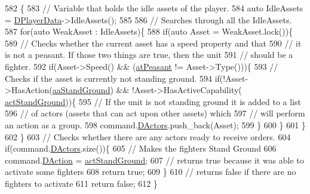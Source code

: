 \begin{DoxyCode}
582                                                               \{
583     \textcolor{comment}{// Variable that holds the idle assets of the player.}
584     \textcolor{keyword}{auto} IdleAssets = \hyperlink{classCAIPlayer_a83b5113c8f7e80df54940b647c5ee2e6}{DPlayerData}->IdleAssets();
585     
586     \textcolor{comment}{// Searches through all the IdleAssets.}
587     \textcolor{keywordflow}{for}(\textcolor{keyword}{auto} WeakAsset : IdleAssets)\{
588         \textcolor{keywordflow}{if}(\textcolor{keyword}{auto} Asset = WeakAsset.lock())\{
589             \textcolor{comment}{// Checks whether the current asset has a speed property and that}
590             \textcolor{comment}{// it is not a peasant. If those two things are true, then the unit}
591             \textcolor{comment}{// should be a fighter.}
592             \textcolor{keywordflow}{if}(Asset->Speed() && (\hyperlink{GameDataTypes_8h_a5600d4fc433b83300308921974477fecaf5e570c7e5a2266810f610e7f945ea61}{atPeasant} != Asset->Type()))\{
593                 \textcolor{comment}{// Checks if the asset is currently not standing ground.}
594                 \textcolor{keywordflow}{if}(!Asset->HasAction(\hyperlink{GameDataTypes_8h_ab47668e651a3032cfb9c40ea2d60d670abd8a4e07a8f888148ed62ddd46719af3}{aaStandGround}) && !Asset->HasActiveCapability(
      \hyperlink{GameDataTypes_8h_a35b98ce26aca678b03c6f9f76e4778cea60ecb1b155c04190174a46d8053b5a04}{actStandGround}))\{
595                     \textcolor{comment}{// If the unit is not standing ground it is added to a list}
596                     \textcolor{comment}{// of actors (assets that can act upon other assets) which }
597                     \textcolor{comment}{// will perform an action as a group.}
598                     command.\hyperlink{structSPlayerCommandRequest_aa37fc01519676345703d78b9f573894a}{DActors}.push\_back(Asset);
599                 \}
600             \}
601         \}
602     \}
603     \textcolor{comment}{// Checks whether there are any actors ready to receive orders.}
604     \textcolor{keywordflow}{if}(command.\hyperlink{structSPlayerCommandRequest_aa37fc01519676345703d78b9f573894a}{DActors}.size())\{
605         \textcolor{comment}{// Makes the fighters Stand Ground}
606         command.\hyperlink{structSPlayerCommandRequest_a80897bbccf2c4e0b148a7aa815a926c6}{DAction} = \hyperlink{GameDataTypes_8h_a35b98ce26aca678b03c6f9f76e4778cea60ecb1b155c04190174a46d8053b5a04}{actStandGround};
607         \textcolor{comment}{// returns true because it was able to activate some fighters}
608         \textcolor{keywordflow}{return} \textcolor{keyword}{true};
609     \}
610     \textcolor{comment}{// returns false if there are no fighters to activate}
611     \textcolor{keywordflow}{return} \textcolor{keyword}{false};
612 \}
\end{DoxyCode}
